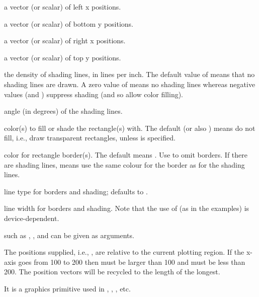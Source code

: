 \begin{Arguments}
\begin{ldescription}
\item[\code{xleft}] a vector (or scalar) of left x positions.
\item[\code{ybottom}] a vector (or scalar) of bottom y positions.
\item[\code{xright}] a vector (or scalar) of right x positions.
\item[\code{ytop}] a vector (or scalar) of top y positions.
\item[\code{density}] the density of shading lines, in lines per inch.
The default value of  means that no shading lines are drawn.
A zero value of  means no shading lines whereas
negative values (and ) suppress shading (and so allow
color filling).
\item[\code{angle}] angle (in degrees) of the shading lines.
\item[\code{col}] color(s) to fill or shade the rectangle(s) with.
The default  (or also ) means do not fill,
i.e., draw transparent rectangles, unless  is specified.
\item[\code{border}] color for rectangle border(s).  The default means
.  Use  to omit borders.
If there are shading
lines,  means use the same colour for
the border as for the shading lines.
\item[\code{lty}] line type for borders and shading; defaults to .
\item[\code{lwd}] line width for borders and shading.  Note that the use of
 (as in the examples) is device-dependent.
\item[\code{...}]  such as , ,
 and  can be given as
arguments.
\end{ldescription}
\end{Arguments}
%
\begin{Details}\relax
The positions supplied, i.e., ,
are relative to the current plotting region.  If the x-axis goes from
100 to 200 then  must be larger than 100 and 
must be less than 200.  The position vectors will be recycled to the
length of the longest.

It is a graphics primitive used in ,
, , etc.
\end{Details}
